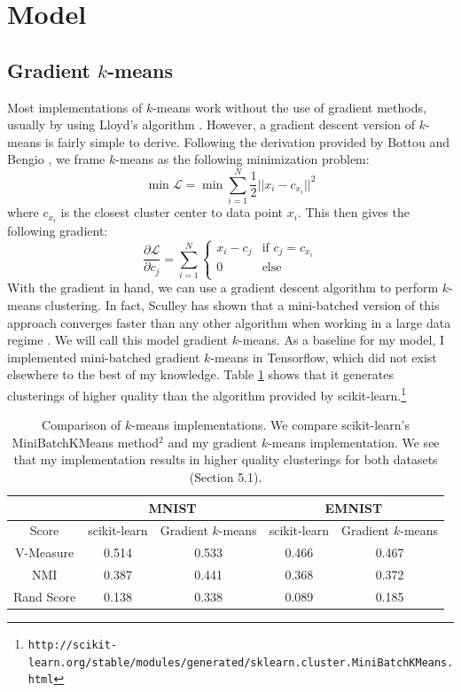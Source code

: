 \section{Model}
\subsection{Gradient $k$-means}
Most implementations of $k$-means work without the use of gradient methods, usually by using Lloyd's algorithm 
\cite{lloyd}. However, a gradient descent version of $k$-means is fairly simple to derive. Following the derivation provided by Bottou and Bengio \cite{convergence}, we frame $k$-means as the following minimization problem:
\begin{equation}
\min \mathcal{L} = \min \sum_{i=1}^N \frac{1}{2} ||x_i - c_{x_i}||^2
\end{equation}
where $c_{x_i}$ is the closest cluster center to data point $x_i$. This then gives the following gradient: 
\begin{equation}
\frac{\partial \mathcal{L}}{\partial c_j} = \sum_{i=1}^N 
\begin{cases}
x_i - c_j  &  \text{if } c_j = c_{x_i} \\
0& \text{else} \\
\end{cases}
\end{equation} 
With the gradient in hand, we can use a gradient descent algorithm to perform $k$-means clustering. In fact, Sculley has shown that a mini-batched version of this approach converges faster than any other algorithm when working in a large data regime \cite{Sculley}. We will call this model gradient $k$-means. As a baseline for my model, I implemented mini-batched gradient $k$-means in Tensorflow, which did not exist elsewhere to the best of my knowledge. Table \ref{sklearn} shows that it generates clusterings of higher quality than the algorithm provided by scikit-learn.\footnote{\texttt{http://scikit-learn.org/stable/modules/generated/sklearn.cluster.MiniBatchKMeans.html}}

\begin{table}
	\caption{Comparison of $k$-means implementations. We compare scikit-learn's MiniBatchKMeans method$^2$  and my gradient $k$-means implementation. We see that my implementation results in higher quality clusterings for both datasets (Section 5.1).}
	\label{sklearn}
	\begin{center}
	\begin{tabular}{|c |c c |c c|}
		\multicolumn{1}{c}{} & \multicolumn{2}{c}{MNIST}   &\multicolumn{2}{c}{EMNIST}   \\
		\hline
		Score & scikit-learn & Gradient $k$-means & scikit-learn & Gradient $k$-means\\
		\hline \hline
	    V-Measure & 0.514 & 0.533 & 0.466 & 0.467 \\ 
		NMI & 0.387 & 0.441 & 0.368 & 0.372\\  
		Rand Score & 0.138 & 0.338 & 0.089 & 0.185\\
		\hline
	\end{tabular}
	\end{center}
\end{table}

